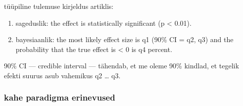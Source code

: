 \documentclass[]{book}
\begin{document}
tüüpiline tulemuse kirjeldus artiklis:

\begin{enumerate}
\def\labelenumi{\arabic{enumi}.}
\item
  sageduslik: the effect is statistically significant (p \textless{}
  0.01).
\item
  bayesiaanlik: the most likely effect size is q1 (90\% CI = q2, q3) and
  the probability that the true effect is \textless{} 0 is q4 percent.
\end{enumerate}

90\% CI --- credible interval --- tähendab, et me oleme 90\% kindlad, et
tegelik efekti suurus asub vahemikus q2 \ldots{} q3.

\subsubsection{kahe paradigma
erinevused}\label{kahe-paradigma-erinevused}
\end{document}
